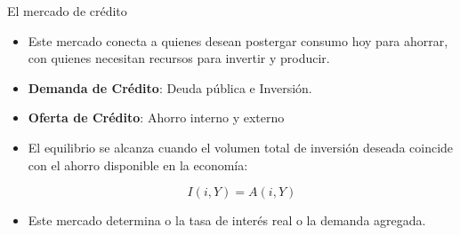 \documentclass{beamer}
\begin{document}
\begin{frame}{El mercado de crédito}
\begin{itemize}
    \item Este mercado conecta a quienes desean postergar consumo hoy para ahorrar, con quienes necesitan recursos para invertir y producir.\vspace{2mm}
    \item \textbf{Demanda de Crédito}: Deuda pública e Inversión.  \vspace{2mm}
    \item \textbf{Oferta de Crédito}: Ahorro interno y externo \vspace{2mm}
    \item El equilibrio se alcanza cuando el volumen total de inversión deseada coincide con el ahorro disponible en la economía:
            \begin{center}
            \begin{tcolorbox}[width=2in, boxsep=0pt, left=0pt, right=0pt, top=2pt,colframe = blue!70!black, colback = blue!7!white]%
                      $$ I(i,Y)=A(i,Y) $$
            \end{tcolorbox}
            \end{center}  \vspace{2mm}
    \item Este mercado determina o la tasa de interés real o la demanda agregada. 
\end{itemize}
\end{frame}
\end{document}
